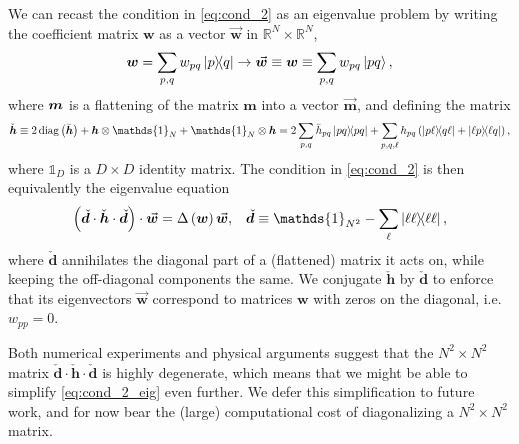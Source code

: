 \documentclass[nofootinbib,notitlepage,11pt]{revtex4-2}
\newcommand{\p}[1]{\left(#1\right)} %
\renewcommand{\c}{\cdot} %
\newcommand{\m}{\bm} %
\renewcommand{\v}{\vec} %
\newcommand{\1}{\mathds{1}}
\newcommand{\RR}{\mathbb{R}}
\DeclareMathOperator{\diag}{diag}
\let\flat\relax
\DeclareMathOperator{\flat}{flat}
\begin{document}
We can recast the condition in \eqref{eq:cond_2} as an eigenvalue
problem by writing the coefficient matrix $\m w$ as a vector
$\v{\m w}$ in $\RR^N\times\RR^N$,
\begin{align}
  \m w = \sum_{p,q} w_{pq} \op{p}{q}
  \to \v{\m w} \equiv \flat\m w \equiv \sum_{p,q} w_{pq} \ket{pq},
\end{align}
where $\flat\m m$ is a flattening of the matrix $\m m$ into a vector
$\vec{\m m}$, and defining the matrix
\begin{align}
  \check{\m h}
  \equiv 2\diag\p{\flat\bar{\m h}}
  + \m h\otimes\1_N + \1_N\otimes\m h
  = 2 \sum_{p,q} \bar h_{pq} \op{pq}
  + \sum_{p,q,\ell} h_{pq} \p{\op{p\ell}{q\ell} + \op{\ell p}{\ell q}},
  \label{eq:h_super_mat}
\end{align}
where $\1_D$ is a $D\times D$ identity matrix.  The condition in
\eqref{eq:cond_2} is then equivalently the eigenvalue equation
\begin{align}
  \p{\check{\m d} \c \check{\m h} \c \check{\m d}} \c \v{\m w}
  = \Delta\p{\m w} \v{\m w},
  &&
  \check{\m d} \equiv \1_{N^2} - \sum_\ell \op{\ell\ell},
  \label{eq:cond_2_eig}
\end{align}
where $\check{\m d}$ annihilates the diagonal part of a (flattened)
matrix it acts on, while keeping the off-diagonal components the same.
We conjugate $\check{\m h}$ by $\check{\m d}$ to enforce that its
eigenvectors $\v{\m w}$ correspond to matrices $\m w$ with zeros on
the diagonal, i.e.~$w_{pp}=0$.

Both numerical experiments and physical arguments suggest that the
$N^2\times N^2$ matrix $\check{\m d} \c \check{\m h} \c \check{\m d}$
is highly degenerate, which means that we might be able to simplify
\eqref{eq:cond_2_eig} even further.  We defer this simplification to
future work, and for now bear the (large) computational cost of
diagonalizing a $N^2\times N^2$ matrix.
\end{document}
